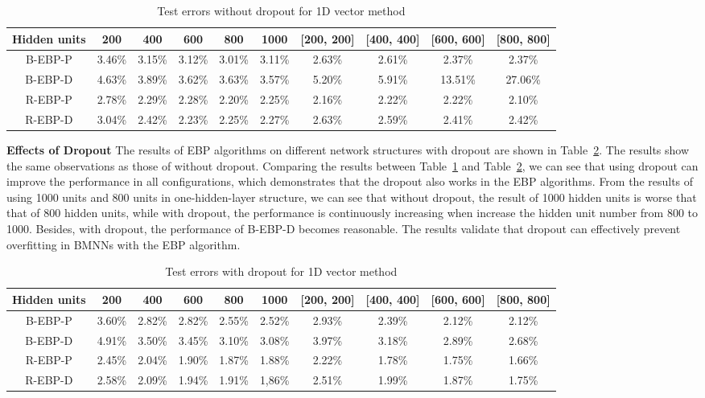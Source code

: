\documentclass{article} %
\begin{document}
\begin{table}
\scriptsize
\centering
\caption{Test errors without dropout for 1D vector method}
\begin{tabular}{|c||c|c|c|c|c||c|c|c|c|} \hline
Hidden units	&	200	&	400	&	600	&	800	&	1000	&	[200, 200]	&	[400, 400]	&	[600, 600]	&	[800, 800]	\\ \hline \hline
B-EBP-P	&	3.46\%	&	3.15\%	&	3.12\%	&	3.01\%	&	3.11\%	&	2.63\%	&	2.61\%	&	2.37\%	&	2.37\%	\\ \hline
B-EBP-D	&	4.63\%	&	3.89\%	&	3.62\%	&	3.63\%	&	3.57\%	&	5.20\%	&	5.91\%	&	13.51\%	&	27.06\%	\\ \hline \hline
R-EBP-P	&	2.78\%	&	2.29\%	&	2.28\%	&	2.20\%	&	2.25\%	&	2.16\%	&	2.22\%	&	2.22\%	&	2.10\%	\\ \hline
R-EBP-D	&	3.04\%	&	2.42\%	&	2.23\%	&	2.25\%	&	2.27\%	&	2.63\%	&	2.59\%	&	2.41\%	&	2.42\%	\\ \hline
\end{tabular}
 \label{tab:1d_without_dropout}
\end{table}

\textbf{Effects of Dropout} The results of EBP algorithms on different network structures with dropout are shown in Table~\ref{tab:1d_with_dropout}. The results show the same observations as those of without dropout. Comparing the results between Table~\ref{tab:1d_without_dropout} and Table~\ref{tab:1d_with_dropout}, we can see that using dropout can improve the performance in all configurations, which demonstrates that the dropout also works in the EBP algorithms. From the results of using 1000 units and 800  units in one-hidden-layer structure, we can see that without dropout, the result of 1000 hidden units is worse that that of 800 hidden units, while with dropout, the performance is continuously increasing when increase the hidden unit number from 800 to 1000. Besides, with dropout, the performance of B-EBP-D becomes reasonable. The results validate that dropout can effectively prevent overfitting in BMNNs with the EBP algorithm.
\begin{table}
\scriptsize
\centering
\caption{Test errors with dropout for 1D vector method}
\begin{tabular}{|c||c|c|c|c|c||c|c|c|c|} \hline
Hidden units	&	200	&	400	&	600	&	800	&	1000	&	[200, 200]	&	[400, 400]	&	[600, 600]	&	[800, 800]	\\ \hline \hline
B-EBP-P	&	3.60\%	&	2.82\%	&	2.82\%	&	2.55\%	&	2.52\%	&2.93\%	&2.39\%	&2.12\%	&2.12\%	\\ \hline
B-EBP-D	&	4.91\%	&	3.50\%	&	3.45\%	&	3.10\%	&	3.08\%	&3.97\%	&3.18\%	&2.89\%	&2.68\%	\\ \hline \hline
R-EBP-P	&	2.45\%	&	2.04\%	&	1.90\%	&	1.87\%	&	1.88\%	&2.22\%	&1.78\%	&1.75\%	&1.66\%	\\ \hline
R-EBP-D	&	2.58\%	&	2.09\%	&	1.94\%	&	1.91\%	&	1,86\%	&2.51\%	&1.99\%	&1.87\%	&1.75\%		\\ \hline
\end{tabular}

 \label{tab:1d_with_dropout}
\end{table}
\end{document}
